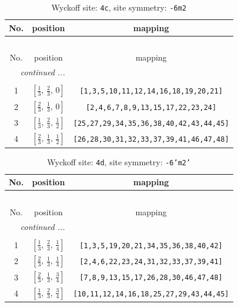\documentclass[fleqn,8pt]{jsarticle}
\begin{document}
\renewcommand{\arraystretch}{1.2}
\begin{longtable}{ccc}
\caption{Wyckoff site: {\tt 4c}, site symmetry: {\tt -6m2}}
 \\
 \hline \hline
No. & position & mapping \\ \hline \endfirsthead

\multicolumn{2}{l}{\tablename\ \thetable{}} \\
 \hline \hline
No. & position & mapping \\ \hline \endhead

 \hline \hline
\multicolumn{2}{r}{\footnotesize\it continued ...} \\ \endfoot

 \hline \hline
\multicolumn{2}{r}{} \\ \endlastfoot

1 & $\left[ \frac{1}{3},\, \frac{2}{3},\, 0 \right]$ & {\tt [1,3,5,10,11,12,14,16,18,19,20,21]} \\ \hline
2 & $\left[ \frac{2}{3},\, \frac{1}{3},\, 0 \right]$ & {\tt [2,4,6,7,8,9,13,15,17,22,23,24]} \\ \hline
3 & $\left[ \frac{1}{3},\, \frac{2}{3},\, \frac{1}{2} \right]$ & {\tt [25,27,29,34,35,36,38,40,42,43,44,45]} \\ \hline
4 & $\left[ \frac{2}{3},\, \frac{1}{3},\, \frac{1}{2} \right]$ & {\tt [26,28,30,31,32,33,37,39,41,46,47,48]} \\
\end{longtable}
\renewcommand{\arraystretch}{1.2}
\begin{longtable}{ccc}
\caption{Wyckoff site: {\tt 4d}, site symmetry: {\tt -6'm2'}}
 \\
 \hline \hline
No. & position & mapping \\ \hline \endfirsthead

\multicolumn{2}{l}{\tablename\ \thetable{}} \\
 \hline \hline
No. & position & mapping \\ \hline \endhead

 \hline \hline
\multicolumn{2}{r}{\footnotesize\it continued ...} \\ \endfoot

 \hline \hline
\multicolumn{2}{r}{} \\ \endlastfoot

1 & $\left[ \frac{1}{3},\, \frac{2}{3},\, \frac{1}{4} \right]$ & {\tt [1,3,5,19,20,21,34,35,36,38,40,42]} \\ \hline
2 & $\left[ \frac{2}{3},\, \frac{1}{3},\, \frac{1}{4} \right]$ & {\tt [2,4,6,22,23,24,31,32,33,37,39,41]} \\ \hline
3 & $\left[ \frac{2}{3},\, \frac{1}{3},\, \frac{3}{4} \right]$ & {\tt [7,8,9,13,15,17,26,28,30,46,47,48]} \\ \hline
4 & $\left[ \frac{1}{3},\, \frac{2}{3},\, \frac{3}{4} \right]$ & {\tt [10,11,12,14,16,18,25,27,29,43,44,45]} \\
\end{longtable}
\end{document}
